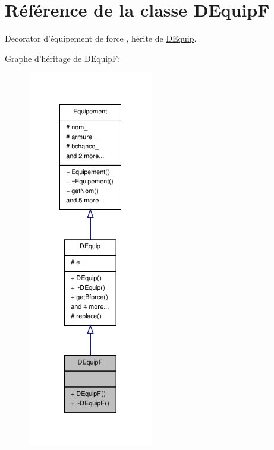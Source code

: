 \hypertarget{class_d_equip_f}{\section{Référence de la classe D\-Equip\-F}
\label{class_d_equip_f}
}


Decorator d'équipement de force , hérite de \hyperlink{class_d_equip}{D\-Equip}.  




Graphe d'héritage de D\-Equip\-F\-:
\nopagebreak
\begin{figure}[H]
\begin{center}
\leavevmode
\includegraphics[width=156pt]{class_d_equip_f__inherit__graph}
\end{center}
\end{figure}


